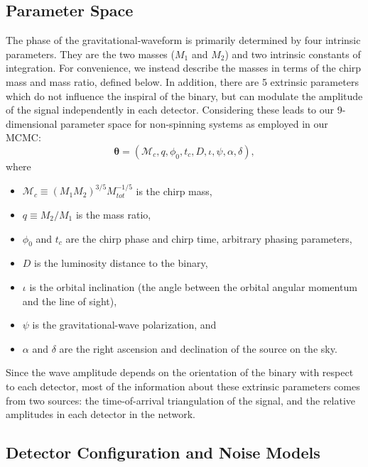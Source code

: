 \documentclass[11pt,a4paper]{emulateapj} 
\newcommand{\carl}[1]{{\color{red} #1}}
\newcommand{\thpara}{\boldsymbol{\theta}}
\newcommand{\chmass}{\mathcal{M}_c}
\begin{document}
 
\subsection{Parameter Space}
\label{parameterSection}
  
\carl{The phase of the gravitational-waveform is primarily determined by four intrinsic parameters.
They are the two masses ($M_1$ and $M_2$) and two intrinsic constants of integration.}
For convenience, we instead describe the masses in terms of the chirp mass and mass ratio, defined below.
 In addition, there are 5 extrinsic
parameters which do not influence the inspiral of the binary, but can modulate
the amplitude of the signal independently in each
detector.  Considering these leads to our 9-dimensional parameter space
for non-spinning systems as employed in our MCMC:
\begin{equation}
\thpara = (\chmass, q, \phi_0,t_c,D,\iota,\psi,\alpha,\delta),
\label{parameterspace}
\end{equation}
where

\begin{itemize}
\item $\chmass \equiv (M_1 M_2)^{3/5}  M_{tot}^{-1/5}$ is the chirp mass,
\item $q\equiv M_2 / M_1$ is the mass ratio,
\item $\phi_0$ and $t_c$ are the chirp phase and chirp time, arbitrary
  phasing parameters,
\item $D$ is the luminosity distance to the binary,
\item $\iota$ is the orbital inclination (the angle between the
  orbital angular momentum and the line of sight),
\item $\psi$ is the gravitational-wave polarization, and
\item $\alpha$ and $\delta$ are the right ascension and declination of
  the source on the sky.
\end{itemize}
  Since the wave amplitude depends on the orientation of the binary
  with respect to each detector, most of the information about these
  extrinsic parameters comes from two sources: the time-of-arrival
  triangulation of the signal, and the relative amplitudes
  in each detector in the network.
  
  \subsection{Detector Configuration and Noise Models}
  \label{detectorSection}
  
\end{document}
